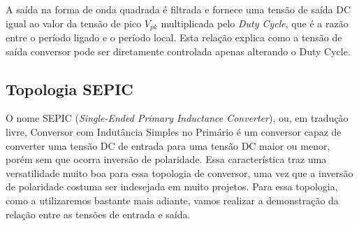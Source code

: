 A saída na forma de onda quadrada é filtrada e fornece uma tensão de saída DC igual ao valor da tensão de pico $V_{pk}$ multiplicada pelo \textit{Duty Cycle}, que é a razão entre o período ligado e o período local. Esta relação explica como a tensão de saída conversor pode ser diretamente controlada apenas alterando o Duty Cycle.  

\subsection*{Topologia SEPIC}
O nome SEPIC (\textit{Single-Ended Primary Inductance Converter}), ou, em tradução livre, Conversor com Indutância Simples no Primário é um conversor capaz de converter uma tensão DC de entrada para uma tensão DC maior ou menor, porém sem que ocorra inversão de polaridade. Essa característica traz uma versatilidade muito boa para essa topologia de conversor, uma vez que a inversão de polaridade costuma ser indesejada em muito projetos.  Para essa topologia, como a utilizaremos bastante mais adiante, vamos realizar a demonstração da relação entre as tensões de entrada e saída.   

\noindent
\begin{minipage}{\linewidth}
\label{sepic_topology_sample}
\end{minipage}

